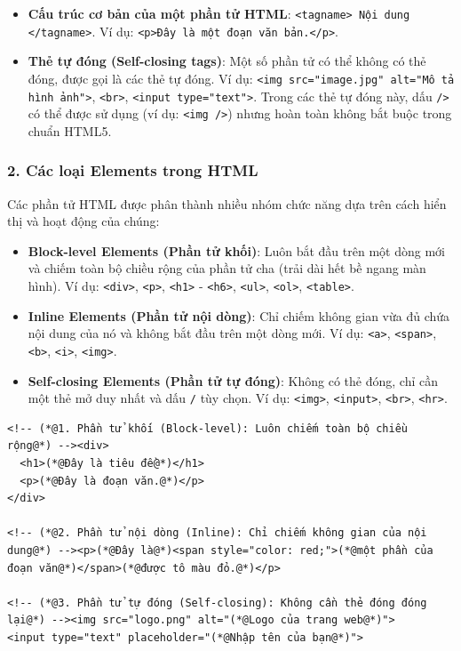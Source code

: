 \documentclass[11pt,oneside]{book}
\newcommand{\codeinline}[1]{\textcolor{accentOrange}{\texttt{#1}}}
\begin{document}
\begin{itemize}[leftmargin=1.8em, itemsep=3pt, parsep=0pt]
    \item \textbf{Cấu trúc cơ bản của một phần tử HTML}: \codeinline{<tagname> Nội dung </tagname>}. Ví dụ: \codeinline{<p>Đây là một đoạn văn bản.</p>}.
    \item \textbf{Thẻ tự đóng (Self-closing tags)}: Một số phần tử có thể không có thẻ đóng, được gọi là các thẻ tự đóng. Ví dụ: \codeinline{<img src="image.jpg" alt="Mô tả hình ảnh">}, \codeinline{<br>}, \codeinline{<input type="text">}. Trong các thẻ tự đóng này, dấu \codeinline{/>} có thể được sử dụng (ví dụ: \codeinline{<img />}) nhưng hoàn toàn không bắt buộc trong chuẩn HTML5.
\end{itemize}

\subsubsection{2. Các loại Elements trong HTML}
Các phần tử HTML được phân thành nhiều nhóm chức năng dựa trên cách hiển thị và hoạt động của chúng:
\begin{itemize}[leftmargin=1.8em, itemsep=4pt, parsep=0pt]
    \item \textbf{Block-level Elements (Phần tử khối)}: Luôn bắt đầu trên một dòng mới và chiếm toàn bộ chiều rộng của phần tử cha (trải dài hết bề ngang màn hình). Ví dụ: \codeinline{<div>}, \codeinline{<p>}, \codeinline{<h1>} - \codeinline{<h6>}, \codeinline{<ul>}, \codeinline{<ol>}, \codeinline{<table>}.
    \item \textbf{Inline Elements (Phần tử nội dòng)}: Chỉ chiếm không gian vừa đủ chứa nội dung của nó và không bắt đầu trên một dòng mới. Ví dụ: \codeinline{<a>}, \codeinline{<span>}, \codeinline{<b>}, \codeinline{<i>}, \codeinline{<img>}.
    \item \textbf{Self-closing Elements (Phần tử tự đóng)}: Không có thẻ đóng, chỉ cần một thẻ mở duy nhất và dấu \codeinline{/} tùy chọn. Ví dụ: \codeinline{<img>}, \codeinline{<input>}, \codeinline{<br>}, \codeinline{<hr>}.
\end{itemize}

\begin{codeWindow}
\begin{lstlisting}[language=HTML5]
<!-- (*@1. Phần tử khối (Block-level): Luôn chiếm toàn bộ chiều rộng@*) --><div>
  <h1>(*@Đây là tiêu đề@*)</h1>
  <p>(*@Đây là đoạn văn.@*)</p>
</div>

<!-- (*@2. Phần tử nội dòng (Inline): Chỉ chiếm không gian của nội dung@*) --><p>(*@Đây là@*)<span style="color: red;">(*@một phần của đoạn văn@*)</span>(*@được tô màu đỏ.@*)</p>

<!-- (*@3. Phần tử tự đóng (Self-closing): Không cần thẻ đóng đóng lại@*) --><img src="logo.png" alt="(*@Logo của trang web@*)">
<input type="text" placeholder="(*@Nhập tên của bạn@*)">
\end{lstlisting}
\end{codeWindow}
\end{document}
